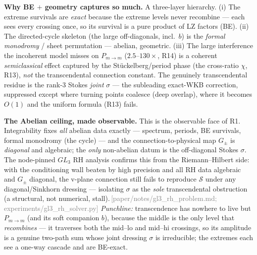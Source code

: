 \documentclass[aps,prd,reprint,nofootinbib]{revtex4-2}
\newcommand{\pnote}[1]{\textcolor{gray}{\footnotesize\,[#1]}}
\newcommand{\Scat}{\mathcal{S}}   %
\newcommand{\Pmid}{P_{m\to m}}   %
\begin{document}
\textbf{Why BE $+$ geometry captures so much.} A three-layer hierarchy. (i) The extreme survivals are
\emph{exact} because the extreme levels never recombine --- each sees every crossing once, so its
survival is a pure product of LZ factors (BE). (ii) The directed-cycle skeleton (the large off-diagonals,
incl.\ $b$) is the \emph{formal monodromy} / sheet permutation --- abelian, geometric. (iii) The large
interference the incoherent model misses on $\Pmid$ ($2.5$--$130\times$, R14) is a coherent
\emph{semiclassical} effect captured by the St\"uckelberg/period phase (the cross-ratio $\chi$, R13),
\emph{not} the transcendental connection constant. The genuinely transcendental residue is the rank-3
Stokes \emph{joint} $\sigma$ --- the subleading exact-WKB correction, suppressed except where turning
points coalesce (deep overlap), where it becomes $O(1)$ and the uniform formula (R13) fails.

\textbf{The Abelian ceiling, made observable.} This is the observable face of R1. Integrability fixes
\emph{all} abelian data exactly --- spectrum, periods, BE survivals, formal monodromy (the cycle) --- and
the connection-to-physical map $G_\pm$ is \emph{diagonal} and algebraic; the \emph{only} non-abelian datum
is the off-diagonal Stokes $\sigma$. The node-pinned $GL_3$ RH analysis confirms this from the
Riemann--Hilbert side: with the conditioning wall beaten by high precision and all RH data algebraic and
$G_\pm$ diagonal, the v-plane connection still fails to reproduce $\Scat$ under any diagonal/Sinkhorn
dressing --- isolating $\sigma$ as the \emph{sole} transcendental obstruction (a structural, not numerical,
stall).\pnote{paper/notes/gl3\_rh\_problem.md; experiments/gl3\_rh\_solver.py} \emph{Punchline:} transcendence
has nowhere to live but $\Pmid$ (and its soft companion $b$), because the middle is the only level that
\emph{recombines} --- it traverses both the mid--lo and mid--hi crossings, so its amplitude is a genuine
two-path sum whose joint dressing $\sigma$ is irreducible; the extremes each see a one-way cascade and are
BE-exact.
\end{document}
